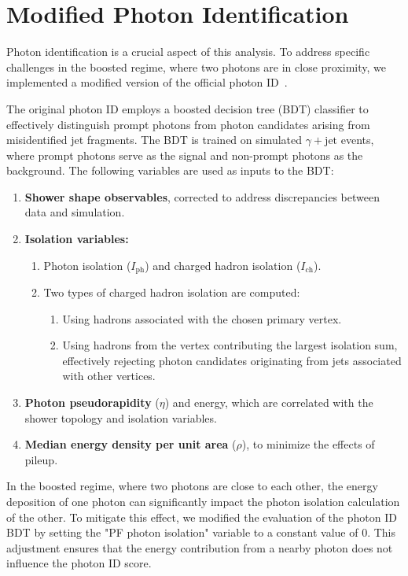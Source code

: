 \chapter{Modified Photon Identification}
\label{appendix:ModifiedPhotonID}

Photon identification is a crucial aspect of this analysis.
To address specific challenges in the boosted regime, where two photons are in close proximity,
we implemented a modified version of the official photon ID~\cite{Sirunyan:2018ouh}.

The original photon ID employs a boosted decision tree (BDT) classifier to effectively distinguish prompt photons from
photon candidates arising from misidentified jet fragments.
The BDT is trained on simulated $\gamma + \text{jet}$ events, where prompt photons serve as the signal and
non-prompt photons as the background.
The following variables are used as inputs to the BDT:

\begin{enumerate}
    \item \textbf{Shower shape observables}, corrected to address discrepancies between data and simulation.
    \item \textbf{Isolation variables:}
    \begin{enumerate}
        \item Photon isolation ($I_\text{ph}$) and charged hadron isolation ($I_\text{ch}$).
        \item Two types of charged hadron isolation are computed:
        \begin{enumerate}
            \item Using hadrons associated with the chosen primary vertex.
            \item Using hadrons from the vertex contributing the largest isolation sum, effectively rejecting photon candidates originating from jets associated with other vertices.
        \end{enumerate}
    \end{enumerate}
    \item \textbf{Photon pseudorapidity} ($\eta$) and energy, which are correlated with the shower topology and isolation variables.
    \item \textbf{Median energy density per unit area} ($\rho$), to minimize the effects of pileup.
\end{enumerate}

In the boosted regime, where two photons are close to each other, the energy deposition of one photon can significantly impact the photon
isolation calculation of the other.
To mitigate this effect, we modified the evaluation of the photon ID BDT by setting the "PF photon isolation" variable
 to a constant value of 0.
 This adjustment ensures that the energy contribution from a nearby photon does not influence the photon ID score.

